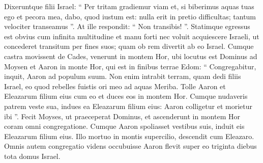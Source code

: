 \begin{biblechapter}
\begin{biblechapter}
\begin{biblechapter}
\begin{biblechapter}
\begin{biblechapter}
\begin{biblechapter}
\begin{biblechapter}
\begin{biblechapter}
\begin{biblechapter}
\begin{biblechapter}
\begin{biblechapter}
\begin{biblechapter}
\begin{biblechapter}
\begin{biblechapter}
\begin{biblechapter}
\begin{biblechapter}
\begin{biblechapter}
\begin{biblechapter}
\begin{biblechapter}
\begin{biblechapter}
\verse Dixeruntque filii Israel: “ Per tritam gradiemur viam et, si biberimus aquas tuas ego et pecora mea, dabo, quod iustum est: nulla erit in pretio difficultas; tantum velociter transeamus ”. 
\verse At ille respondit: “ Non transibis! ”. Statimque egressus est obvius cum infinita multitudine et manu forti 
\verse nec voluit acquiescere Israeli, ut concederet transitum per fines suos; quam ob rem divertit ab eo Israel.
 \verse Cumque castra movissent de Cades, venerunt in montem Hor, 
\verse ubi locutus est Dominus ad Moysen et Aaron in monte Hor, qui est in finibus terrae Edom: 
 \verse “ Congregabitur, inquit, Aaron ad populum suum. Non enim intrabit terram, quam dedi filiis Israel, eo quod rebelles fuistis ori meo ad aquas Meriba. 
 \verse Tolle Aaron et Eleazarum filium eius cum eo et duces eos in montem Hor. 
 \verse Cumque nudaveris patrem veste sua, indues ea Eleazarum filium eius: Aaron colligetur et morietur ibi ”. 
\verse Fecit Moyses, ut praeceperat Dominus, et ascenderunt in montem Hor coram omni congregatione. 
\verse Cumque Aaron spoliasset vestibus suis, induit eis Eleazarum filium eius. Illo mortuo in montis supercilio, descendit cum Eleazaro. 
\verse Omnis autem congregatio videns occubuisse Aaron flevit super eo triginta diebus tota domus Israel.
 

\end{biblechapter}
\end{biblechapter}
\end{biblechapter}
\end{biblechapter}
\end{biblechapter}
\end{biblechapter}
\end{biblechapter}
\end{biblechapter}
\end{biblechapter}
\end{biblechapter}
\end{biblechapter}
\end{biblechapter}
\end{biblechapter}
\end{biblechapter}
\end{biblechapter}
\end{biblechapter}
\end{biblechapter}
\end{biblechapter}
\end{biblechapter}
\end{biblechapter}
